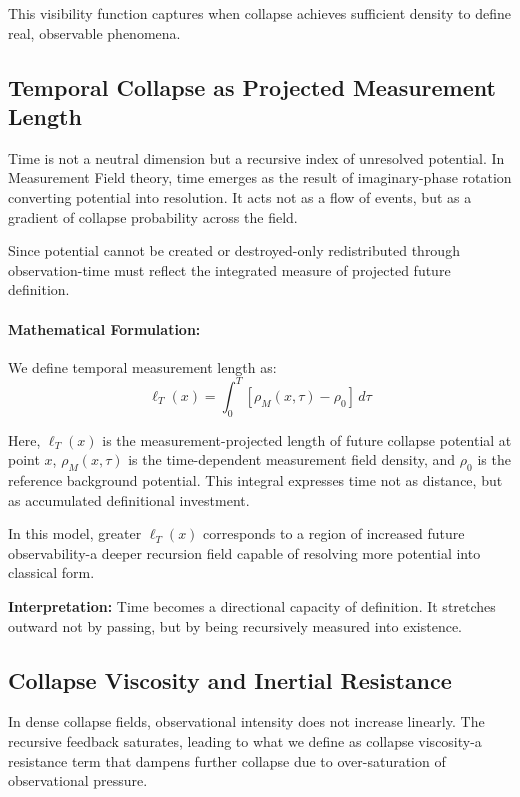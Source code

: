 This visibility function captures when collapse achieves sufficient density to define real, observable phenomena.

\subsection*{Temporal Collapse as Projected Measurement Length}
Time is not a neutral dimension but a recursive index of unresolved potential. In Measurement Field theory, time emerges as the result of imaginary-phase rotation converting potential into resolution. It acts not as a flow of events, but as a gradient of collapse probability across the field.

Since potential cannot be created or destroyed-only redistributed through observation-time must reflect the integrated measure of projected future definition.

\paragraph{Mathematical Formulation:}\cite{chapter8_meta}
We define temporal measurement length as:
\begin{equation}
\ell_T(x) = \int_0^T \left[ \rho_M(x,\tau) - \rho_0 \right] \, d\tau
\end{equation}

Here, $\ell_T(x)$ is the measurement-projected length of future collapse potential at point $x$, $\rho_M(x,\tau)$ is the time-dependent measurement field density, and $\rho_0$ is the reference background potential. This integral expresses time not as distance, but as accumulated definitional investment.

In this model, greater $\ell_T(x)$ corresponds to a region of increased future observability-a deeper recursion field capable of resolving more potential into classical form.

\textbf{Interpretation:} Time becomes a directional capacity of definition. It stretches outward not by passing, but by being recursively measured into existence.

\subsection*{Collapse Viscosity and Inertial Resistance}

In dense collapse fields, observational intensity does not increase linearly. The recursive feedback saturates, leading to what we define as collapse viscosity-a resistance term that dampens further collapse due to over-saturation of observational pressure.

